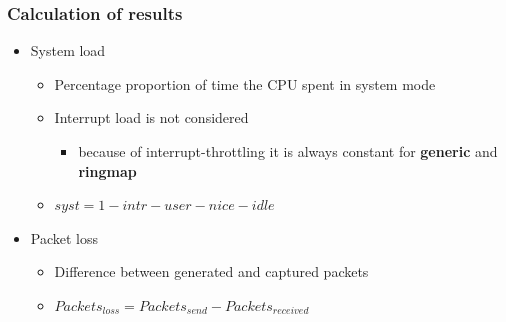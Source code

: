 \begin{frame}
\frametitle{Calculation of results}
\begin{itemize}
	\item System load
		\begin{itemize}
			\item Percentage proportion of time the CPU spent in system mode
			\item Interrupt load is not considered
				\begin{itemize}
					\item because of interrupt-throttling it is always constant for \textbf{generic} and \textbf{ringmap}
				\end{itemize}
			\item $syst = 1 - intr - user - nice - idle$\newline
		\end{itemize}
	\item Packet loss
		\begin{itemize}
			\item Difference between generated and captured packets
			\item $Packets_{loss} = Packets_{send} - Packets_{received}$
		\end{itemize}
\end{itemize}
\end{frame}

